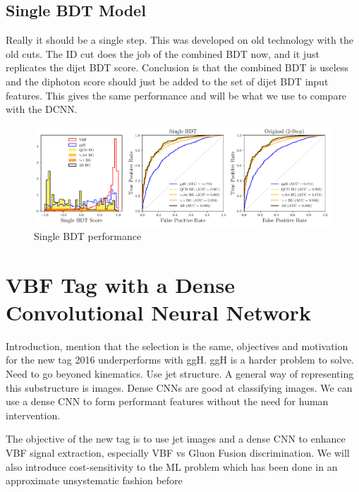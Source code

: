 \subsection{Single BDT Model}
Really it should be a single step. This was developed on old technology with the old cuts. The ID cut does the job of the combined BDT now, and it just replicates the dijet BDT score. Conclusion is that the combined BDT is useless and the diphoton score should just be added to the set of dijet BDT input features. This gives the same performance and will be what we use to compare with the DCNN. 

\begin{figure}[h!]
    \includegraphics[width=0.99\textwidth]{figures/event_selection/dijet_BDT_PS_unw.pdf}
    \caption{Single BDT performance}
    \label{fig:event_categorisation:single_BDT}
\end{figure}











\section{VBF Tag with a Dense Convolutional Neural Network}
Introduction, mention that the selection is the same, objectives and motivation for the new tag
2016 underperforms with ggH. ggH is a harder problem to solve. Need to go beyoned kinematics. Use jet structure.
A general way of representing this substructure is images. Dense CNNs are good at classifying images. 
We can use a dense CNN to form performant features without the need for human intervention. 

The objective of the new tag is to use jet images and a dense CNN to enhance VBF signal extraction, especially VBF vs Gluon Fusion discrimination. 
We will also introduce cost-sensitivity to the ML problem which has been done in an approximate unsystematic fashion before

